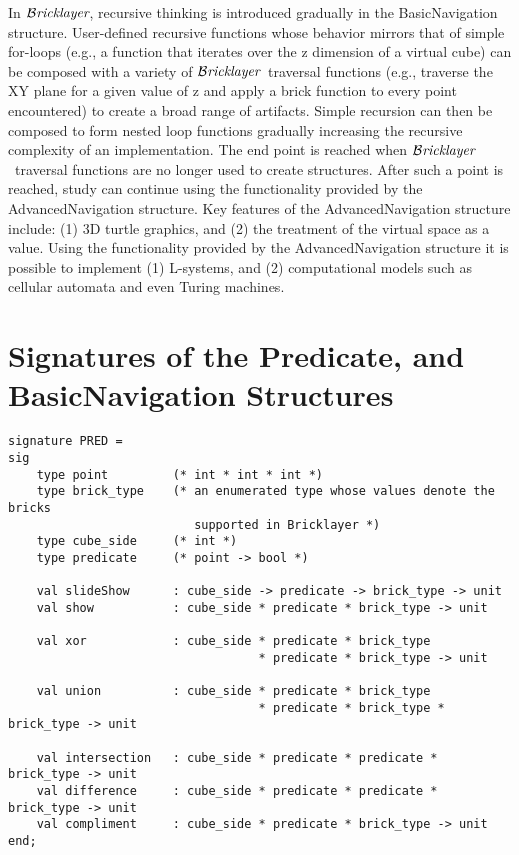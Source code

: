 \documentclass[submission,copyright,creativecommons]{eptcs}
\newcommand{\bricklayer}{\ensuremath{\mathcal{B}\emph{ricklayer}}}
\begin{document}
In \bricklayer, recursive thinking is introduced gradually in the BasicNavigation structure. User-defined recursive functions whose behavior mirrors that of simple for-loops (e.g., a function that iterates over the z dimension of a virtual cube) can be composed with a variety of \bricklayer\ traversal functions (e.g., traverse the XY plane for a given value of z and apply a brick function to every point encountered) to create a broad range of artifacts. Simple recursion can then be composed to form nested loop functions gradually increasing the recursive complexity of an implementation. The end point is reached when \bricklayer\ traversal functions are no longer used to create structures. After such a point is reached, study can continue using the functionality provided by the AdvancedNavigation structure. Key features of the AdvancedNavigation structure include: (1) 3D turtle graphics, and (2) the treatment of the virtual space as a value. Using the functionality provided by the AdvancedNavigation structure it is possible to implement (1) L-systems, and (2) computational models such as cellular automata and even Turing machines.









\newpage
\appendix
\section{Signatures of the Predicate, and BasicNavigation Structures}\label{appendix-predicate}


\begin{lstlisting}
signature PRED =
sig
    type point         (* int * int * int *)
    type brick_type    (* an enumerated type whose values denote the bricks
                          supported in Bricklayer *)
    type cube_side     (* int *)
    type predicate     (* point -> bool *)

    val slideShow      : cube_side -> predicate -> brick_type -> unit
    val show           : cube_side * predicate * brick_type -> unit

    val xor            : cube_side * predicate * brick_type
                                   * predicate * brick_type -> unit

    val union          : cube_side * predicate * brick_type
                                   * predicate * brick_type * brick_type -> unit

    val intersection   : cube_side * predicate * predicate * brick_type -> unit
    val difference     : cube_side * predicate * predicate * brick_type -> unit
    val compliment     : cube_side * predicate * brick_type -> unit
end;
\end{lstlisting}
\end{document}
